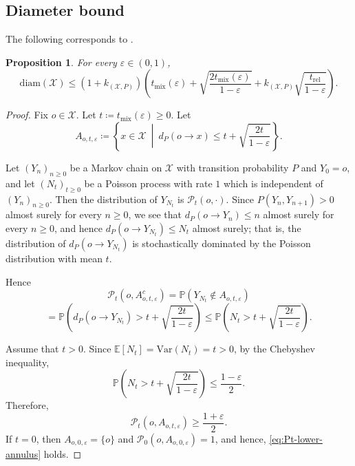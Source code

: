 \documentclass[a4paper, reqno, 11pt]{amsart}
\newtheorem{Prop}[Thm]{Proposition}
\theoremstyle{definition}
\begin{document}
\subsection{Diameter bound}\label{subsec:diameter}


The following corresponds to \cite[Lemma 11]{Salez2024}. 

\begin{Prop}\label{prop:6.3}
For every $\varepsilon \in (0,1)$,
\[ \mathrm{diam}(\mathcal{X}) \le (1+k_{(\mathcal{X}, P)})\left(t_{\mathrm{mix}}(\varepsilon)+\sqrt{\frac{2t_{\mathrm{mix}}(\varepsilon)}{1-\varepsilon}}+k_{(\mathcal{X}, P)}\sqrt{\frac{t_{\mathrm{rel}}}{1-\varepsilon}}\right).\]
\end{Prop}


\begin{proof}
Fix $o \in \mathcal{X}$. 
Let $t \coloneqq t_{\mathrm{mix}}(\varepsilon) \ge 0$. 
Let
\[ A_{o,t,\varepsilon} \coloneqq \left\{x\in\mathcal{X}\ \middle|\ d_P (o \to x) \le t+\sqrt{\frac{2t}{1-\varepsilon}}\right\}. \]

Let $(Y_n)_{n \ge 0}$ be a Markov chain on $\mathcal{X}$ with transition probability $P$ and $Y_0 = o$,
and let $(N_t)_{t \ge 0}$ be a Poisson process with rate $1$ which is independent of $(Y_n)_{n \ge 0}$.
Then the distribution of $Y_{N_t}$ is $\mathscr{P}_t (o, \cdot)$.
Since $P(Y_{n}, Y_{n+1}) > 0$ almost surely for every $n \ge 0$, we see that $d_P (o \to Y_n) \le n$ almost surely for every $n \ge 0$,
and hence $d_P (o \to Y_{N_t}) \le N_t$ almost surely;
that is, the distribution of $d_P (o \to Y_{N_t})$ is stochastically dominated by the Poisson distribution with mean $t$.

Hence
\[ \mathscr{P}_t\left(o, A_{o,t,\varepsilon}^c\right) = \mathbb{P} \left(Y_{N_t} \notin A_{o,t,\varepsilon}\right) \]
\[ = \mathbb{P} \!\left(d_P (o \to Y_{N_t}) > t+\sqrt{\frac{2t}{1-\varepsilon}}\right) \le \mathbb{P}\!\left(N_t >  t+\sqrt{\frac{2t}{1-\varepsilon}}\right). \]

Assume that $t > 0$. 
Since $\mathbb{E}[N_t] = \mathrm{Var}(N_t) = t > 0$, by the Chebyshev inequality,
\[ \mathbb{P}\!\left(N_t > t+\sqrt{\frac{2t}{1-\varepsilon}}\right) \le  \frac{1-\varepsilon}{2}. \]
Therefore, 
\begin{equation}\label{eq:Pt-lower-annulus}
\mathscr{P}_t \left(o,A_{o,t,\varepsilon}\right)\ge \frac{1+\varepsilon}{2}. 
\end{equation}
If $t=0$, then $A_{o,0,\varepsilon} = \{o\}$ and $\mathcal P_0(o,A_{o,0,\varepsilon})=1$, and hence, \eqref{eq:Pt-lower-annulus} holds. 



\end{proof}
\end{document}
